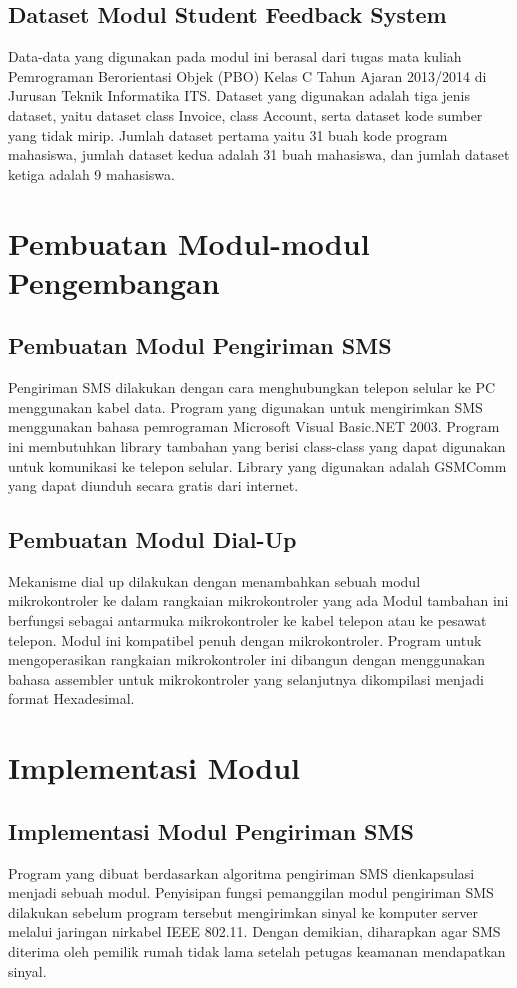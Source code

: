 \subsection{Dataset Modul Student Feedback System}
Data-data yang digunakan pada modul ini berasal dari tugas mata kuliah Pemrograman Berorientasi Objek (PBO) Kelas C Tahun Ajaran 2013/2014 di Jurusan Teknik Informatika ITS. Dataset yang digunakan adalah tiga jenis dataset, yaitu dataset class Invoice, class Account, serta dataset kode sumber yang tidak mirip. Jumlah dataset pertama yaitu 31 buah kode program mahasiswa, jumlah dataset kedua adalah 31 buah mahasiswa, dan jumlah dataset ketiga adalah 9 mahasiswa.


\section{Pembuatan Modul-modul Pengembangan}
\subsection{Pembuatan Modul Pengiriman SMS}
Pengiriman SMS dilakukan dengan cara menghubungkan telepon selular ke PC menggunakan kabel data. 
Program yang digunakan untuk mengirimkan SMS menggunakan bahasa pemrograman Microsoft Visual Basic.NET 2003. Program ini membutuhkan library tambahan yang berisi class-class yang dapat digunakan untuk komunikasi ke telepon selular. Library yang digunakan adalah GSMComm yang dapat diunduh secara gratis dari internet. 
\subsection{Pembuatan Modul Dial-Up}
Mekanisme dial up dilakukan dengan menambahkan sebuah modul mikrokontroler ke dalam rangkaian mikrokontroler yang ada
Modul tambahan ini berfungsi sebagai antarmuka mikrokontroler ke kabel telepon atau ke pesawat telepon. Modul ini kompatibel penuh dengan mikrokontroler. 
Program untuk mengoperasikan rangkaian mikrokontroler ini dibangun dengan menggunakan bahasa assembler untuk mikrokontroler yang selanjutnya dikompilasi menjadi format Hexadesimal.


\section{Implementasi Modul}
\subsection{Implementasi Modul Pengiriman SMS}
Program yang dibuat berdasarkan algoritma pengiriman SMS dienkapsulasi menjadi sebuah modul. Penyisipan fungsi pemanggilan modul pengiriman SMS dilakukan sebelum program tersebut mengirimkan sinyal ke komputer server melalui jaringan nirkabel IEEE 802.11. Dengan demikian, diharapkan agar SMS diterima oleh pemilik rumah tidak lama setelah petugas keamanan mendapatkan sinyal. 
